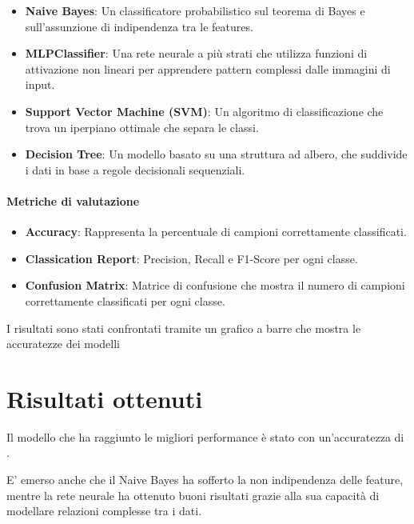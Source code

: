\documentclass{article}
\begin{document}
\begin{itemize}
    \item \textbf{Naive Bayes}: Un classificatore probabilistico sul teorema di Bayes e sull'assunzione
    di indipendenza tra le features.
    \item \textbf{MLPClassifier}: Una rete neurale a più strati che utilizza funzioni di attivazione 
    non lineari per apprendere pattern complessi dalle immagini di input.
    \item \textbf{Support Vector Machine (SVM)}: Un algoritmo di classificazione che trova un iperpiano 
    ottimale che separa le classi. 
    \item \textbf{Decision Tree}: Un modello basato su una struttura ad albero, che suddivide i dati in 
    base a regole decisionali sequenziali. 
\end{itemize}

\paragraph{Metriche di valutazione}
\begin{itemize}
    \item \textbf{Accuracy}: Rappresenta la percentuale di campioni correttamente classificati.
    \item \textbf{Classication Report}: Precision, Recall e F1-Score per ogni classe.
    \item \textbf{Confusion Matrix}: Matrice di confusione che mostra il numero di campioni correttamente 
    classificati per ogni classe.
\end{itemize}

I risultati sono stati confrontati tramite un grafico a barre che mostra le accuratezze dei modelli

\section{Risultati ottenuti}

Il modello che ha raggiunto le migliori performance è stato \textbf{} con un'accuratezza di \textbf{}. 

E' emerso anche che il Naive Bayes ha sofferto la non indipendenza delle feature, mentre la rete neurale 
ha ottenuto buoni risultati grazie alla sua capacità di modellare relazioni complesse tra i dati. 
\end{document}
